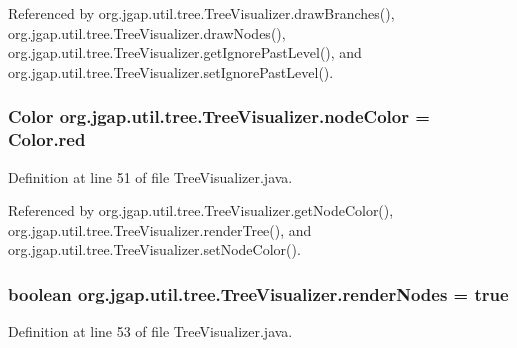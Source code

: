 Referenced by org.\-jgap.\-util.\-tree.\-Tree\-Visualizer.\-draw\-Branches(), org.\-jgap.\-util.\-tree.\-Tree\-Visualizer.\-draw\-Nodes(), org.\-jgap.\-util.\-tree.\-Tree\-Visualizer.\-get\-Ignore\-Past\-Level(), and org.\-jgap.\-util.\-tree.\-Tree\-Visualizer.\-set\-Ignore\-Past\-Level().

\hypertarget{classorg_1_1jgap_1_1util_1_1tree_1_1_tree_visualizer_ae95f328ad72f53d508eb50c83b2bceac}{
\subsubsection[{node\-Color}]{\setlength{\rightskip}{0pt plus 5cm}Color org.\-jgap.\-util.\-tree.\-Tree\-Visualizer.\-node\-Color = Color.\-red\hspace{0.3cm}{\ttfamily [private]}}}\label{classorg_1_1jgap_1_1util_1_1tree_1_1_tree_visualizer_ae95f328ad72f53d508eb50c83b2bceac}


Definition at line 51 of file Tree\-Visualizer.\-java.



Referenced by org.\-jgap.\-util.\-tree.\-Tree\-Visualizer.\-get\-Node\-Color(), org.\-jgap.\-util.\-tree.\-Tree\-Visualizer.\-render\-Tree(), and org.\-jgap.\-util.\-tree.\-Tree\-Visualizer.\-set\-Node\-Color().

\hypertarget{classorg_1_1jgap_1_1util_1_1tree_1_1_tree_visualizer_a1ae0b34cf547dbd9587346f304f71e9f}{
\subsubsection[{render\-Nodes}]{\setlength{\rightskip}{0pt plus 5cm}boolean org.\-jgap.\-util.\-tree.\-Tree\-Visualizer.\-render\-Nodes = true\hspace{0.3cm}{\ttfamily [private]}}}\label{classorg_1_1jgap_1_1util_1_1tree_1_1_tree_visualizer_a1ae0b34cf547dbd9587346f304f71e9f}


Definition at line 53 of file Tree\-Visualizer.\-java.



